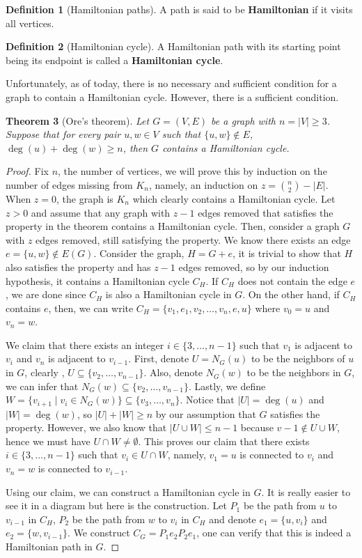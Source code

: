 \documentclass{tufte-handout}
\newtheorem{thm}{Theorem}
\theoremstyle{definition}
\newtheorem{defn}[thm]{Definition}
\theoremstyle{remark}
\begin{document}
\begin{defn}[Hamiltonian paths]
	A path is said to be \textbf{Hamiltonian} if it visits all vertices.
\end{defn}
\begin{defn}[Hamiltonian cycle]
	A Hamiltonian path with its starting point being its endpoint is called a \textbf{Hamiltonian cycle}.
\end{defn}
Unfortunately, as of today, there is no necessary and sufficient condition for a graph to contain a Hamiltonian cycle. However, there is a sufficient condition.
\begin{thm}[Ore's theorem]
	Let $G = (V,E)$ be a graph with $n = |V| \geq 3$. Suppose that for every pair $u,w \in V$ such that $\{u,w\} \notin E$, $\deg(u) + \deg(w) \geq n$, then $G$ contains a Hamiltonian cycle.
\end{thm}
\begin{proof}
	Fix $n$, the number of vertices, we will prove this by induction on the number of edges missing from $K_n$, namely, an induction on $z = \binom{n}{2}-|E|$. When $z=0$, the graph is $K_n$ which clearly contains a Hamiltonian cycle. Let $z > 0$ and assume that any graph with $z-1$ edges removed that satisfies the property in the theorem contains a Hamiltonian cycle. Then, consider a graph $G$ with $z$ edges removed, still satisfying the property. We know there exists an edge $e = \{u,w\} \notin E(G)$. Consider the graph, $H = G+e$, it is trivial to show that $H$ also satisfies the property and has $z-1$ edges removed, so by our induction hypothesis, it contains a Hamiltonian cycle $C_H$. If $C_H$ does not contain the edge $e$, we are done since $C_H$ is also a Hamiltonian cycle in $G$. On the other hand, if $C_H$ contains $e$, then, we can write $C_H = \{v_1, e_1, v_2, \dots, v_n, e, u\}$ where $v_0 = u$ and $v_n = w$.
	
	We claim that there exists an integer $i \in \{3,\dots, n-1\}$ such that $v_1$ is adjacent to $v_i$ and $v_n$ is adjacent to $v_{i-1}$. First, denote $U = N_G(u)$ to be the neighbors of $u$ in $G$, clearly , $U \subseteq \{v_2, \dots, v_{n-1}\}$. Also, denote $N_G(w)$ to be the neighbors in $G$, we can infer that $N_G(w) \subseteq \{v_2, \dots, v_{n-1}\}$. Lastly, we define $W = \{v_{i+1} \mid v_i \in N_G(w)\} \subseteq \{v_3, \dots, v_n\}$. Notice that $|U| = \deg(u)$ and $|W| = \deg(w)$, so $|U| + |W| \geq n$ by our assumption that $G$ satisfies the property. However, we also know that $|U \cup W| \leq n-1$ because $v-1 \notin U\cup W$, hence we must have $U \cap W \neq \emptyset$. This proves our claim that there exists $i \in \{3,\dots, n-1\}$ such that $v_i \in U \cap W$, namely, $v_1 = u$ is connected to $v_i$ and $v_n = w$ is connected to $v_{i-1}$.
	
	Using our claim, we can construct a Hamiltonian cycle in $G$. It is really easier to see it in a diagram but here is the construction. Let $P_1$ be the path from $u$ to $v_{i-1}$ in $C_H$, $P_2$ be the path from $w$ to $v_{i}$ in $C_H$ and denote $e_1 = \{u,v_i\}$ and $e_2 = \{w,v_{i-1}\}$. We construct $C_G = P_1e_2P_2e_1$, one can verify that this is indeed a Hamiltonian path in $G$.
\end{proof}
\end{document}
